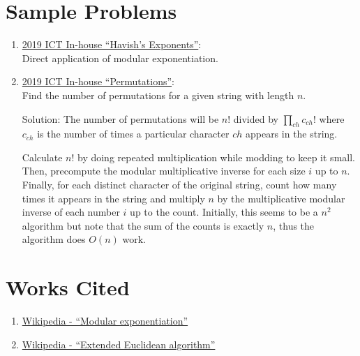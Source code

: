 \documentclass[11pt, oneside]{article}
\begin{document}
\section{Sample Problems}

\begin{enumerate}
  \item \href{https://codeforces.com/group/M4wsRWBHyZ/contest/238084/problem/E}{2019 ICT In-house ``Havish's Exponents''}: \\
  Direct application of modular exponentiation.

  \item \href{https://codeforces.com/group/M4wsRWBHyZ/contest/238084/problem/G}{2019 ICT In-house ``Permutations''}: \\
  Find the number of permutations for a given string with length \( n \).

  Solution: The number of permutations will be \( n! \) divided by \( \prod_{ch} c_{ch}! \) where
  \( c_{ch} \) is the number of times a particular character \( ch \) appears in the string.

  Calculate \( n! \) by doing repeated multiplication while modding to keep it small. Then, precompute
  the modular multiplicative inverse for each size \( i \) up to \( n \). Finally, for each distinct
  character of the original string, count how many times it appears in the string and multiply \( n \)
  by the multiplicative modular inverse of each number \( i \) up to the count. Initially, this seems to be a \( n^2 \) algorithm but note that the sum of the counts is exactly \( n \), thus the algorithm does \( O(n) \) work.

\end{enumerate}

\section{Works Cited}

\begin{enumerate}
  \item \href{https://en.wikipedia.org/wiki/Modular_exponentiation}{Wikipedia - ``Modular exponentiation''}
  \item \href{https://en.wikipedia.org/wiki/Extended_Euclidean_algorithm}{Wikipedia - ``Extended Euclidean algorithm''}
\end{enumerate}
\end{document}
